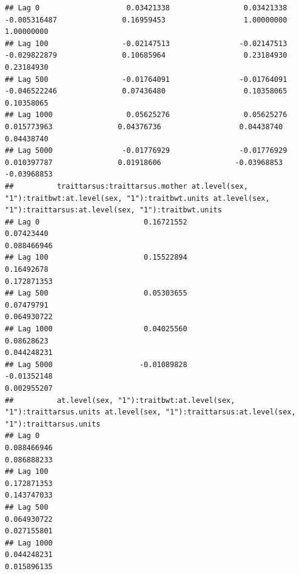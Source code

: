 \documentclass[
  12pt,
]{book}
\begin{document}
\begin{verbatim}
## Lag 0                    0.03421338                 0.03421338                  -0.005316487               0.16959453                  1.00000000                  1.00000000
## Lag 100                 -0.02147513                -0.02147513                  -0.029822879               0.10685964                  0.23184930                  0.23184930
## Lag 500                 -0.01764091                -0.01764091                  -0.046522246               0.07436480                  0.10358065                  0.10358065
## Lag 1000                 0.05625276                 0.05625276                   0.015773963               0.04376736                  0.04438740                  0.04438740
## Lag 5000                -0.01776929                -0.01776929                   0.010397787               0.01918606                 -0.03968853                 -0.03968853
##          traittarsus:traittarsus.mother at.level(sex, "1"):traitbwt:at.level(sex, "1"):traitbwt.units at.level(sex, "1"):traittarsus:at.level(sex, "1"):traitbwt.units
## Lag 0                        0.16721552                                                    0.07423440                                                      0.088466946
## Lag 100                      0.15522894                                                    0.16492678                                                      0.172871353
## Lag 500                      0.05303655                                                    0.07479791                                                      0.064930722
## Lag 1000                     0.04025560                                                    0.08628623                                                      0.044248231
## Lag 5000                    -0.01089828                                                   -0.01352148                                                      0.002955207
##          at.level(sex, "1"):traitbwt:at.level(sex, "1"):traittarsus.units at.level(sex, "1"):traittarsus:at.level(sex, "1"):traittarsus.units
## Lag 0                                                         0.088466946                                                         0.086888233
## Lag 100                                                       0.172871353                                                         0.143747033
## Lag 500                                                       0.064930722                                                         0.027155801
## Lag 1000                                                      0.044248231                                                         0.015896135

\end{verbatim}
\end{document}
